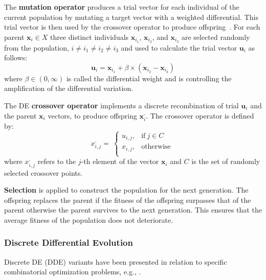  The \textbf{mutation operator} produces a trial vector for each individual of the current population by mutating a target vector with a weighted differential. This trial vector is then used by the crossover operator to produce offspring~\cite{engelbrecht2008computational}. For each parent $\mathbf{x}_{i}\in X$ three distinct individuals $\mathbf{x}_{i_1}$,  $\mathbf{x}_{i_2}$, and $\mathbf{x}_{i_3}$ are selected randomly from the population, $i \neq i_1 \neq i_2 \neq i_3$ and used to calculate the trial vector $\mathbf{u}_i$ as follows:
\begin{equation}
    \mathbf{u}_i = \mathbf{x}_{i_1}+\beta\times (\mathbf{x}_{i_2}-\mathbf{x}_{i_3})
\end{equation}
where $\beta \in (0, \infty )$ is called the differential weight and is controlling the amplification of the differential variation. 

The DE  \textbf{crossover operator} implements a discrete recombination of trial $\mathbf{u}_i$ and the parent $\mathbf{x}_i$ vectors, to produce offspring $\mathbf{x}^{,}_i$. The crossover operator is defined by:
\begin{equation}
     x^{,}_{i,j} = \ \left\{ \begin{matrix}
u_{i,j}, & \mathrm{\text{if}}\ j \in C \\
x_{i,j}, & \mathrm{\text{otherwise}} \\
\end{matrix} \right.\   
\end{equation}
where $x^{,}_{i,j}$ refers to the $j$-th element of the vector $\mathbf{x}_i$ and $C$ is the set of randomly selected crossover points.

\textbf{Selection} is applied to construct the population for the next generation. The offspring replaces the parent if the fitness of the offspring surpasses that of the parent otherwise the parent survives to the next generation. This ensures that the average fitness of the population does not deteriorate.

\subsubsection{Discrete Differential Evolution}
Discrete DE (DDE) variants have been presented in relation to specific
combinatorial optimization problems, e.g., \cite{davendra_flow_2009,pan_discrete_2008,wang_novel_2010}. 

